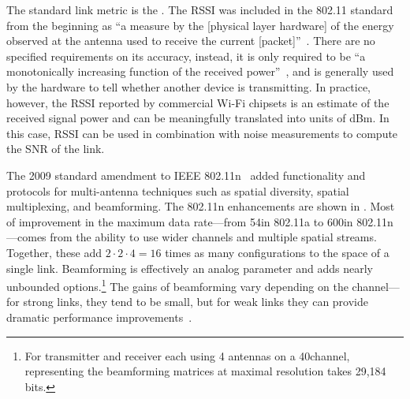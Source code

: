 The standard link metric is the . The RSSI was included in the 802.11 standard from the beginning as ``a measure by the [physical layer hardware] of the energy observed at the antenna used to receive the current [packet]''~\cite[\S 17.2.3.2]{80211}. There are no specified requirements on its accuracy, instead, it is only required to be ``a monotonically increasing function of the received power''~\cite[\S 17.2.3.2]{80211}, and is generally used by the hardware to tell whether another device is transmitting. In practice, however, the RSSI reported by commercial Wi-Fi chipsets is an estimate of the received signal power and can be meaningfully translated into units of dBm. In this case, RSSI can be used in combination with noise measurements to compute the SNR of the link.

The 2009 standard amendment to IEEE 802.11n~\cite{80211n} added functionality and protocols for multi-antenna techniques such as spatial diversity, spatial multiplexing, and beamforming. The 802.11n enhancements are shown in . Most of improvement in the maximum data rate---from 54\Mbps in 802.11a to 600\Mbps in 802.11n---comes from the ability to use wider channels and multiple spatial streams. Together, these add $2\cdot2\cdot4=16$ times as many configurations to the space of a single link. Beamforming is effectively an analog parameter and adds nearly unbounded options.\footnote{For transmitter and receiver each using 4 antennas on a 40\MHz channel, representing the beamforming matrices at maximal resolution takes 29,184 bits.} The gains of beamforming vary depending on the channel---for strong links, they tend to be small, but for weak links they can provide dramatic performance improvements~\cite{Atheros_11nTechPaper}.

